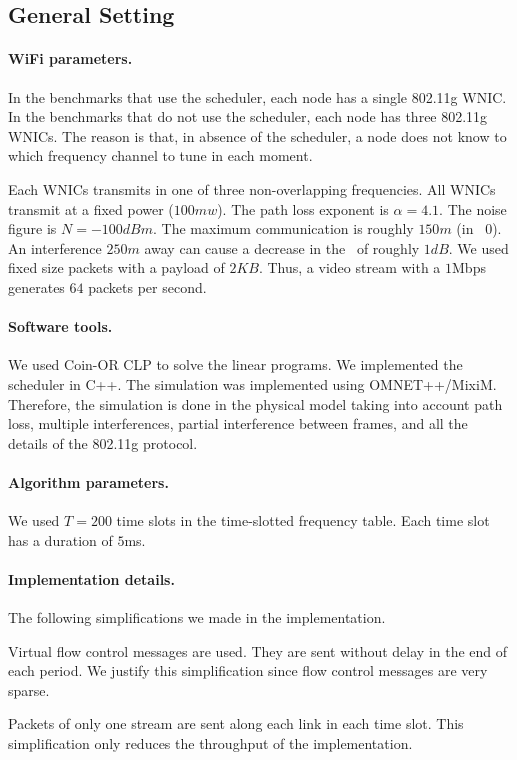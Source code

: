 \documentclass[11pt]{article}
\newenvironment{proof sketch}[1]{\noindent {\emph{Proof sketch of #1:}}}{\hfill \qed}
\newcommand{\SINR}{\text{\sc{sinr}}}
\newcommand{\MCS}{\text{\sc{mcs}}}
\begin{document}
\subsection{General Setting}\label{sec:exp}
\paragraph{WiFi parameters.}  In the benchmarks that use the
scheduler, each node has a single 802.11g WNIC.  In the benchmarks
that do not use the scheduler, each node has three 802.11g WNICs.  The
reason is that, in absence of the scheduler, a node does not know to
which frequency channel to tune in each moment.

Each WNICs transmits in one of three non-overlapping frequencies.  All
WNICs transmit at a fixed power ($100mw$). The path loss exponent is
$\alpha=4.1$. The noise figure is $N=-100dBm$. The maximum
communication is roughly $150m$ (in \MCS\ $0$). An interference $250m$
away can cause a decrease in the \SINR\ of roughly $1dB$. We used
fixed size packets with a payload of $2KB$.  Thus, a video stream with
a $1$Mbps generates $64$ packets per second.



\paragraph{Software tools.}  We used Coin-OR CLP to solve the linear
programs.  We implemented the scheduler in C++.  The simulation was
implemented using OMNET++/MixiM. Therefore, the simulation is done in
the physical model taking into account path loss, multiple
interferences, partial interference between frames, and all the
details of the 802.11g protocol.

\paragraph{Algorithm parameters.} We used $T=200$ time slots in the
time-slotted frequency table.  Each time slot has a duration of $5$ms.

\paragraph{Implementation details.}
The following simplifications we made in the implementation.
\begin{inparaenum}[(1)]
\item Virtual flow control messages are used. They are sent without
  delay in the end of each period. We justify this simplification
  since flow control messages are very sparse.
\item Packets of only one stream are sent along each link in each time
  slot.  This simplification only reduces the throughput of the
  implementation.
\end{inparaenum}
\end{document}
